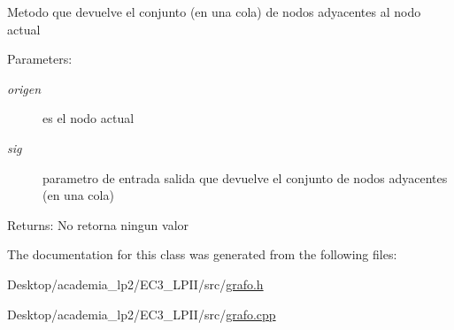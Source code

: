 Metodo que devuelve el conjunto (en una cola) de nodos adyacentes al nodo actual \begin{Desc}
\item[Parameters:]
\begin{description}
\item[{\em origen}]es el nodo actual \item[{\em sig}]parametro de entrada salida que devuelve el conjunto de nodos adyacentes (en una cola) \end{description}
\end{Desc}
\begin{Desc}
\item[Returns:]No retorna ningun valor \end{Desc}


The documentation for this class was generated from the following files:\begin{CompactItemize}
\item 
Desktop/academia\_\-lp2/EC3\_\-LPII/src/\hyperlink{grafo_8h}{grafo.h}\item 
Desktop/academia\_\-lp2/EC3\_\-LPII/src/\hyperlink{grafo_8cpp}{grafo.cpp}\end{CompactItemize}
